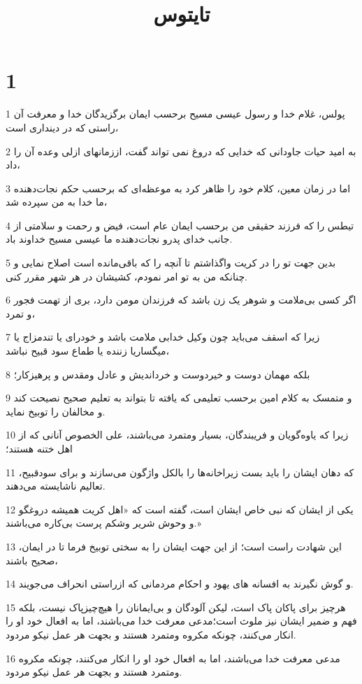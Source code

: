 

\title{تايتوس}


\chapter{1}

\par 1 پولس، غلام خدا و رسول عیسی مسیح برحسب ایمان برگزیدگان خدا و معرفت آن راستی که در دینداری است،
\par 2 به امید حیات جاودانی که خدایی که دروغ نمی تواند گفت، اززمانهای ازلی وعده آن را داد،
\par 3 اما در زمان معین، کلام خود را ظاهر کرد به موعظه‌ای که برحسب حکم نجات‌دهنده ما خدا به من سپرده شد،
\par 4 تیطس را که فرزند حقیقی من برحسب ایمان عام است، فیض و رحمت و سلامتی از جانب خدای پدرو نجات‌دهنده ما عیسی مسیح خداوند باد.
\par 5 بدین جهت تو را در کریت واگذاشتم تا آنچه را که باقی‌مانده است اصلاح نمایی و چنانکه من به تو امر نمودم، کشیشان در هر شهر مقرر کنی.
\par 6 اگر کسی بی‌ملامت و شوهر یک زن باشد که فرزندان مومن دارد، بری از تهمت فجور و تمرد،
\par 7 زیرا که اسقف می‌باید چون وکیل خدابی ملامت باشد و خودرای یا تندمزاج یا میگساریا زننده یا طماع سود قبیح نباشد،
\par 8 بلکه مهمان دوست و خیردوست و خرداندیش و عادل ومقدس و پرهیزکار؛
\par 9 و متمسک به کلام امین برحسب تعلیمی که یافته تا بتواند به تعلیم صحیح نصیحت کند و مخالفان را توبیخ نماید.
\par 10 زیرا که یاوه‌گویان و فریبندگان، بسیار ومتمرد می‌باشند، علی الخصوص آنانی که از اهل ختنه هستند؛
\par 11 که دهان ایشان را باید بست زیراخانه‌ها را بالکل واژگون می‌سازند و برای سودقبیح، تعالیم ناشایسته می‌دهند.
\par 12 یکی از ایشان که نبی خاص ایشان است، گفته است که «اهل کریت همیشه دروغگو و وحوش شریر وشکم پرست بی‌کاره می‌باشند.»
\par 13 این شهادت راست است؛ از این جهت ایشان را به سختی توبیخ فرما تا در ایمان، صحیح باشند،
\par 14 و گوش نگیرند به افسانه های یهود و احکام مردمانی که ازراستی انحراف می‌جویند.
\par 15 هرچیز برای پاکان پاک است، لیکن آلودگان و بی‌ایمانان را هیچ‌چیزپاک نیست، بلکه فهم و ضمیر ایشان نیز ملوث است؛مدعی معرفت خدا می‌باشند، اما به افعال خود او را انکار می‌کنند، چونکه مکروه ومتمرد هستند و بجهت هر عمل نیکو مردود.
\par 16 مدعی معرفت خدا می‌باشند، اما به افعال خود او را انکار می‌کنند، چونکه مکروه ومتمرد هستند و بجهت هر عمل نیکو مردود.

